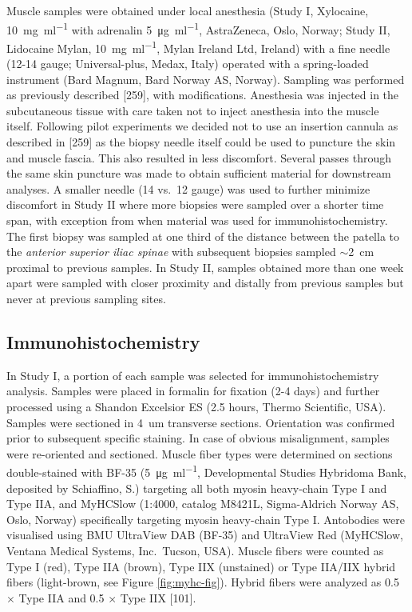 \documentclass[twoside,10pt]{gihclass} %
\begin{document}
Muscle samples were obtained under local anesthesia (Study I, Xylocaine,
\SI{10}{\mg\per\ml} with adrenalin \SI{5}{\micro\gram\per\ml},
AstraZeneca, Oslo, Norway; Study II, Lidocaine Mylan,
\SI{10}{\mg\per\ml}, Mylan Ireland Ltd, Ireland) with a fine needle
(12-14 gauge; Universal-plus, Medax, Italy) operated with a
spring-loaded instrument (Bard Magnum, Bard Norway AS, Norway).
Sampling was performed as previously described
{[}259{]}, with
modifications. Anesthesia was injected in the subcutaneous tissue with
care taken not to inject anesthesia into the muscle itself. Following
pilot experiments we decided not to use an insertion cannula as
described in {[}259{]} as the biopsy needle itself could be used to
puncture the skin and muscle fascia. This also resulted in less
discomfort. Several passes through the same skin puncture was made to
obtain sufficient material for downstream analyses. A smaller needle (14
vs.~12 gauge) was used to further minimize discomfort in Study II where
more biopsies were sampled over a shorter time span, with exception from
when material was used for immunohistochemistry. The first biopsy was
sampled at one third of the distance between the patella to the
\emph{anterior superior iliac spinae} with subsequent biopsies sampled
\(\sim\)\SI{2}{cm} proximal to previous samples. In Study II, samples
obtained more than one week apart were sampled with closer proximity and
distally from previous samples but never at previous sampling sites.

\hypertarget{immunohistochemistry}{%
\subsection{Immunohistochemistry}\label{immunohistochemistry}}

In Study I, a portion of each sample was selected for immunohistochemistry analysis. Samples were placed in formalin for fixation (2-4 days) and further processed using a Shandon Excelsior ES (2.5 hours, Thermo Scientific, USA). Samples were sectioned in \SI{4}{um} transverse sections. Orientation was confirmed prior to subsequent specific staining. In case of obvious misalignment, samples were re-oriented and sectioned. Muscle fiber types were determined on sections double-stained with BF-35 (\SI{5}{\micro\gram\per\milli\litre}, Developmental Studies Hybridoma Bank, deposited by Schiaffino, S.) targeting all both myosin heavy-chain Type I and Type IIA, and MyHCSlow (1:4000, catalog M8421L, Sigma-Aldrich Norway AS, Oslo, Norway) specifically targeting myosin heavy-chain Type I.
Antobodies were visualised using BMU UltraView DAB (BF-35) and UltraView Red (MyHCSlow, Ventana Medical Systems, Inc.~Tucson, USA).
Muscle fibers were counted as Type I (red), Type IIA (brown), Type IIX (unstained) or Type IIA/IIX hybrid fibers (light-brown, see Figure \ref{fig:myhc-fig}). Hybrid fibers were analyzed as 0.5 \(\times\) Type IIA and 0.5 \(\times\) Type IIX
{[}101{]}.
\end{document}
